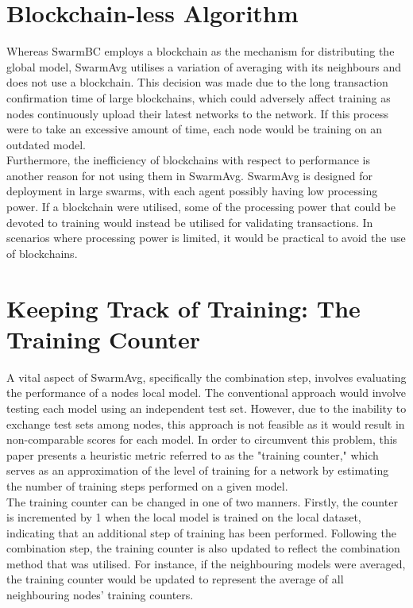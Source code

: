\section{Blockchain-less Algorithm}
Whereas SwarmBC employs a blockchain as the mechanism for distributing the global model, SwarmAvg utilises a variation of averaging with its neighbours and does not use a blockchain. This decision was made due to the long transaction confirmation time of large blockchains, which could adversely affect training as nodes continuously upload their latest networks to the network. If this process were to take an excessive amount of time, each node would be training on an outdated model. \\

Furthermore, the inefficiency of blockchains with respect to performance is another reason for not using them in SwarmAvg. SwarmAvg is designed for deployment in large swarms, with each agent possibly having low processing power. If a blockchain were utilised, some of the processing power that could be devoted to training would instead be utilised for validating transactions. In scenarios where processing power is limited, it would be practical to avoid the use of blockchains.

\section{Keeping Track of Training: The Training Counter}
A vital aspect of SwarmAvg, specifically the combination step, involves evaluating the performance of a nodes local model. The conventional approach would involve testing each model using an independent test set. However, due to the inability to exchange test sets among nodes, this approach is not feasible as it would result in non-comparable scores for each model. In order to circumvent this problem, this paper presents a heuristic metric referred to as the "training counter," which serves as an approximation of the level of training for a network by estimating the number of training steps performed on a given model. \\

The training counter can be changed in one of two manners. Firstly, the counter is incremented by 1 when the local model is trained on the local dataset, indicating that an additional step of training has been performed. Following the combination step, the training counter is also updated to reflect the combination method that was utilised. For instance, if the neighbouring models were averaged, the training counter would be updated to represent the average of all neighbouring nodes' training counters.

